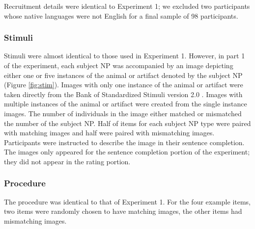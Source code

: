 \documentclass[10pt,letterpaper]{article}
\begin{document}
Recruitment details were identical to Experiment 1; we excluded two participants whose native languages were not English for a final sample of 98 participants.

\subsubsection{Stimuli} 

Stimuli were almost identical to those used in Experiment 1. However, in part 1 of the experiment, each subject NP was accompanied by an image depicting either one or five instances of the animal or artifact denoted by the subject NP (Figure \ref{fig:stim}). Images with only one instance of the animal or artifact were taken directly from the Bank of Standardized Stimuli version 2.0 \cite{Brodeur:2014}. Images with multiple instances of the animal or artifact were created from the single instance images. The number of individuals in the image either matched or mismatched the number of the subject NP. Half of items for each subject NP type were paired with matching images and half were paired with mismatching images. Participants were instructed to describe the image in their sentence completion. The images only appeared for the sentence completion portion of the experiment; they did not appear in the rating portion.

\subsubsection{Procedure} 

The procedure was identical to that of Experiment 1. For the four example items, two items were randomly chosen to have matching images, the other items had mismatching images.

\end{document}
